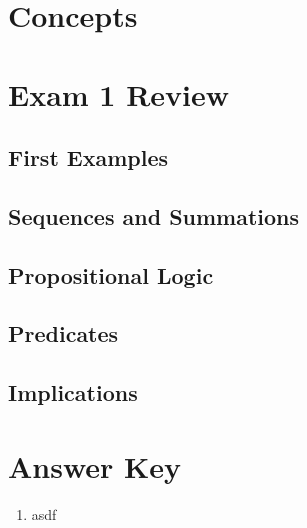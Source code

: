 
\newcommand{\laClass}       {CS 210}
\newcommand{\laSemester}    {Spring 2018}
\newcommand{\laChapter}     {}
\newcommand{\laType}        {}
\newcommand{\laPoints}      {5}
\newcommand{\laTitle}       {Exam 1 Review}
\newcommand{\laDate}        {}
\setcounter{chapter}{1}
\setcounter{section}{1}
\addtocounter{section}{-1}

\toggletrue{answerkey}
\togglefalse{answerkey}




    \chapter*{Concepts}

    \chapter*{\laTitle}

    \section{First Examples}

        \begin{questionNOGRADE}{\thequestion}
            
        \end{questionNOGRADE}
    
    \section{Sequences and Summations}

    \section{Propositional Logic}

    \section{Predicates}

    \section{Implications}




\chapter*{Answer Key}

\begin{enumerate}
    \item   asdf
\end{enumerate}


